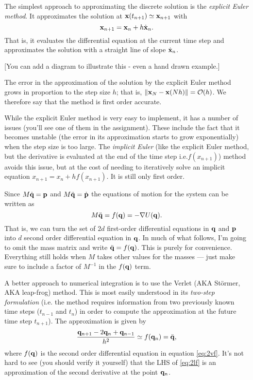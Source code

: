 The simplest approach to approximating the discrete solution is the \emph{explicit Euler method}. It approximates the solution at ${\bf x}(t_{n+1})\simeq {\bf x}_{n+1}$ with
$$
	{\bf x}_{n+1} = {\bf x}_n + h \dot{\bf x}_n.
$$
That is, it evaluates the differential equation at the current time step and approximates the solution with a straight line of slope $\dot{\bf x}_n$. 

[You can add a diagram to illustrate this - even a hand drawn example.]

The error in the approximation of the solution by the explicit Euler method grows in proportion to the step size $h$; that is, $\|{\bf x}_N-{\bf x}(Nh)\|=\mathcal{O}(h)$. We therefore say that the method is first order accurate.

While the explicit Euler method is very easy to implement, it has a number of issues (you'll see one of them in the assignment). These include the fact that it becomes unstable (the error in its approximation starts to grow exponentially) when the step size is too large. The \emph{implicit Euler} (like the explicit Euler method, but the derivative is evaluated at the end of the time step i.e.$f(x_{n+1})$) method avoids this issue, but at the cost of needing to iteratively solve an implicit equation $x_{n+1}=x_n+hf(x_{n+1})$. It is still only first order.

Since $M\dot{\bf q} = {\bf p}$ and $M\ddot{\bf q} = \dot{\bf p}$ the equations of motion for the system can be written as
\begin{equation}
	M\ddot{\bf q} = f({\bf q}) = -\nabla U({\bf q}).
	\label{eq:2vf}
\end{equation}
That is, we can turn the set of $2d$ first-order differential equations in ${\bf q}$ and ${\bf p}$ into $d$ second order differential equation in ${\bf q}$.
In much of what follows, I'm going to omit the mass matrix and write $\ddot{\bf q} = f({\bf q})$. This is purely for convenience. Everything still holds when $M$ takes other values for the masses --- just make sure to include a factor of $M^{-1}$ in the $f({\bf q})$ term.

A better approach to numerical integration is to use the Verlet (AKA St\"{o}rmer, AKA leap-frog) method. This is most easily understood in its \emph{two-step formulation} (i.e. the method requires information from two previously known time steps ($t_{n-1}$ and $t_n$) in order to compute the approximation at the future time step $t_{n+1}$). The approximation is given by 
\begin{equation}
	\frac{{\bf q}_{n+1} - 2{\bf q}_n + {\bf q}_{n-1}}{h^2} \simeq f({\bf q}_n) = \ddot{\bf q},
	\label{eq:2lf}
\end{equation}
where $f({\bf q})$ is the second order differential equation in equation \ref{eq:2vf}. It's not hard to see (you should verify it yourself) that the LHS of \ref{eq:2lf} is an approximation of the second derivative at the point ${\bf q}_n$.

